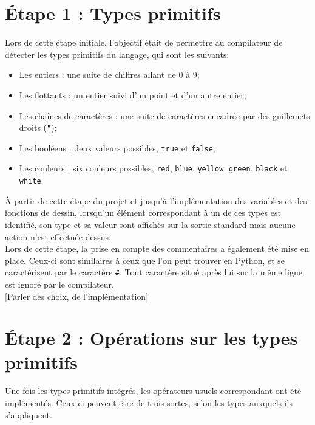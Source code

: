 \documentclass[a4paper, 12pt]{report}
\begin{document}
\chapter{\'Etape 1 : Types primitifs}
    
    Lors de cette étape initiale, l'objectif était de permettre au compilateur de détecter les types primitifs du langage, qui sont les suivants:\\
    
    \begin{itemize}
    	\item Les entiers : une suite de chiffres allant de 0 à 9;
    	\item Les flottants : un entier suivi d'un point et d'un autre entier;
    	\item Les cha\^ines de caractères : une suite de caractères encadrée par des guillemets droits (\texttt{"});
    	\item Les booléens : deux valeurs possibles, \texttt{true} et \texttt{false};
    	\item Les couleurs : six couleurs possibles, \texttt{red}, \texttt{blue}, \texttt{yellow}, \texttt{green}, \texttt{black} et \texttt{white}.\\
    \end{itemize}
    
    \`A partir de cette étape du projet et jusqu'à l'implémentation des variables et des fonctions de dessin, lorsqu'un élément correspondant à un de ces types est identifié, son type et sa valeur sont affichés sur la sortie standard mais aucune action n'est effectuée dessus.\\
    
    Lors de cette étape, la prise en compte des commentaires a également été mise en place. Ceux-ci sont similaires à ceux que l'on peut trouver en Python, et se caractérisent par le caractère \texttt{\#}. Tout caractère situé après lui sur la même ligne est ignoré par le compilateur.\\
    
    [Parler des choix, de l'implémentation]
    
\chapter{\'Etape 2 : Opérations sur les types primitifs}

	Une fois les types primitifs intégrés, les opérateurs usuels correspondant ont été implémentés. Ceux-ci peuvent être de trois sortes, selon les types auxquels ils s'appliquent.\\
	
\end{document}
